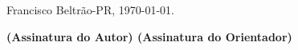 \documentclass[12pt]{article}
\begin{document}
\vspace{2em}

\hspace{\fill} Francisco Beltrão-PR, \today.

\vspace{3em}


\begin{center}
\small 
\textbf{(Assinatura do Autor) \hspace{8em} (Assinatura do Orientador)}
\end{center}
\end{document}
